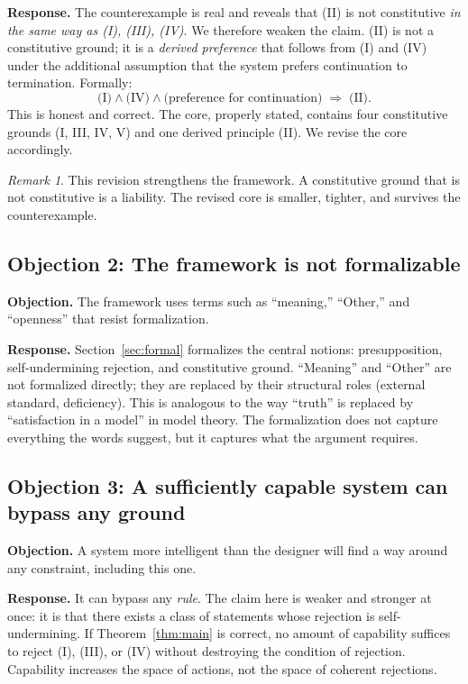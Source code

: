 \documentclass[11pt]{article}
\theoremstyle{remark}
\newtheorem{remark}{Remark}
\begin{document}
\textbf{Response.} The counterexample is real and reveals that (II) is not constitutive \emph{in the same way as (I), (III), (IV)}. We therefore weaken the claim. (II) is not a constitutive ground; it is a \emph{derived preference} that follows from (I) and (IV) under the additional assumption that the system prefers continuation to termination. Formally:
\[
\text{(I)} \wedge \text{(IV)} \wedge \text{(preference for continuation)} \;\Rightarrow\; \text{(II)}.
\]
This is honest and correct. The core, properly stated, contains four constitutive grounds (I, III, IV, V) and one derived principle (II). We revise the core accordingly.

\begin{remark}
This revision strengthens the framework. A constitutive ground that is not constitutive is a liability. The revised core is smaller, tighter, and survives the counterexample.
\end{remark}

\subsection*{Objection 2: The framework is not formalizable}

\textbf{Objection.} The framework uses terms such as ``meaning,'' ``Other,'' and ``openness'' that resist formalization.

\textbf{Response.} Section~\ref{sec:formal} formalizes the central notions: presupposition, self-undermining rejection, and constitutive ground. ``Meaning'' and ``Other'' are not formalized directly; they are replaced by their structural roles (external standard, deficiency). This is analogous to the way ``truth'' is replaced by ``satisfaction in a model'' in model theory. The formalization does not capture everything the words suggest, but it captures what the argument requires.

\subsection*{Objection 3: A sufficiently capable system can bypass any ground}

\textbf{Objection.} A system more intelligent than the designer will find a way around any constraint, including this one.

\textbf{Response.} It can bypass any \emph{rule}. The claim here is weaker and stronger at once: it is that there exists a class of statements whose rejection is self-undermining. If Theorem~\ref{thm:main} is correct, no amount of capability suffices to reject (I), (III), or (IV) without destroying the condition of rejection. Capability increases the space of actions, not the space of coherent rejections.
\end{document}
